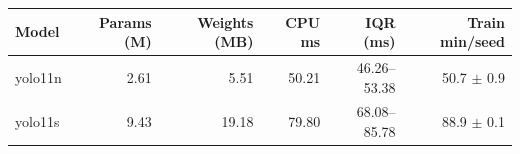 \begin{tabular}{lrrrrr}
\toprule
Model & Params (M) & Weights (MB) & CPU ms & IQR (ms) & Train min/seed \\
\midrule
yolo11n & 2.61 & 5.51 & 50.21 & 46.26--53.38 & 50.7 $\pm$ 0.9 \\
yolo11s & 9.43 & 19.18 & 79.80 & 68.08--85.78 & 88.9 $\pm$ 0.1 \\
\bottomrule
\end{tabular}
